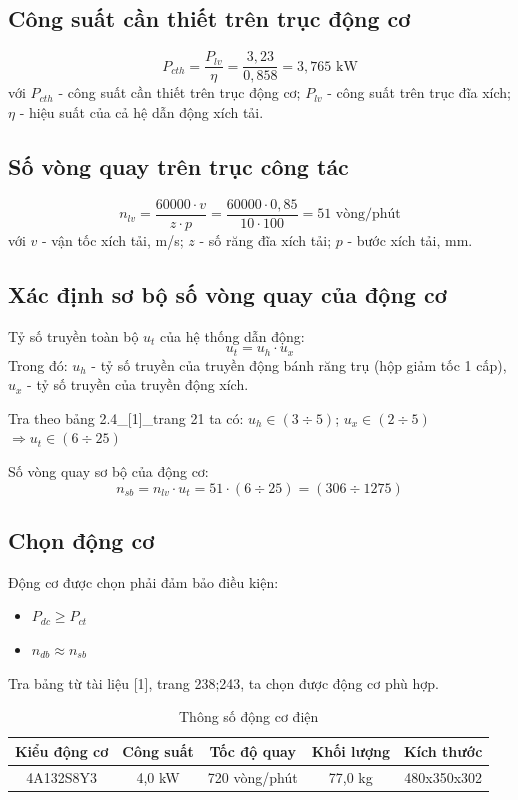 \documentclass[12pt,a4paper]{report}
\begin{document}
\subsection{Công suất cần thiết trên trục động cơ}
$$P_{cth} = \frac{P_{lv}}{\eta} = \frac{3{,}23}{0{,}858} = 3{,}765 \text{ kW}$$
với $P_{cth}$ - công suất cần thiết trên trục động cơ; $P_{lv}$ - công suất trên trục đĩa xích; $\eta$ - hiệu suất của cả hệ dẫn động xích tải.

\subsection{Số vòng quay trên trục công tác}
$$n_{lv} = \frac{60000 \cdot v}{z \cdot p} = \frac{60000 \cdot 0{,}85}{10 \cdot 100} = 51 \text{ vòng/phút}$$
với $v$ - vận tốc xích tải, m/s; $z$ - số răng đĩa xích tải; $p$ - bước xích tải, mm.

\subsection{Xác định sơ bộ số vòng quay của động cơ}
Tỷ số truyền toàn bộ $u_t$ của hệ thống dẫn động:
$$u_t = u_h \cdot u_x$$
Trong đó: $u_h$ - tỷ số truyền của truyền động bánh răng trụ (hộp giảm tốc 1 cấp), $u_x$ - tỷ số truyền của truyền động xích.

Tra theo bảng 2.4\_[1]\_trang 21 ta có: $u_h \in (3 \div 5)$; $u_x \in (2 \div 5)$ $\Rightarrow u_t \in (6 \div 25)$

Số vòng quay sơ bộ của động cơ:
$$n_{sb} = n_{lv} \cdot u_t = 51 \cdot (6 \div 25) = (306 \div 1275)$$

\subsection{Chọn động cơ}
Động cơ được chọn phải đảm bảo điều kiện:
\begin{itemize}
    \item $P_{dc} \geq P_{ct}$
    \item $n_{db} \approx n_{sb}$
\end{itemize}
Tra bảng từ tài liệu [1], trang 238;243, ta chọn được động cơ phù hợp.

\begin{table}[H]
    \centering
    \caption{Thông số động cơ điện}
    \label{tab:1.1}
    \begin{tabular}{|c|c|c|c|c|}
        \hline
        Kiểu động cơ & Công suất & Tốc độ quay & Khối lượng & Kích thước \\
        \hline
        4A132S8Y3 & 4,0 kW & 720 vòng/phút & 77,0 kg & 480x350x302 \\
        \hline
    \end{tabular}
\end{table}
\end{document}
